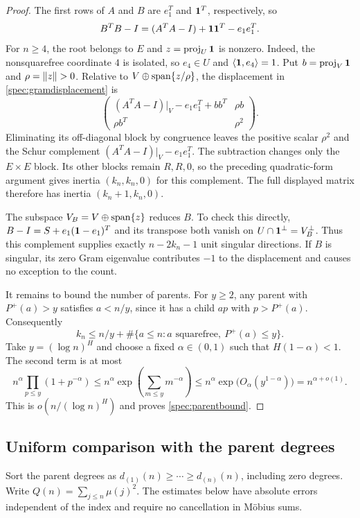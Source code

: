 \begin{proof}
The first rows of $A$ and $B$ are $e_1^T$ and $\mathbf{1}^T$, respectively, so
\begin{equation}\label{spec:gramdisplacement}
 B^TB-I=(A^TA-I)+\mathbf{1}\mathbf{1}^T-e_1e_1^T.
\end{equation}
For $n\ge4$, the root belongs to $E$ and $z=\operatorname{proj}_U\mathbf{1}$ is nonzero. Indeed, the nonsquarefree coordinate $4$ is isolated, so $e_4\in U$ and $\langle\mathbf{1},e_4\rangle=1$. Put $b=\operatorname{proj}_V\mathbf{1}$ and $\rho=\left\lVert z\right\rVert>0$. Relative to $V\oplus\operatorname{span}\{z/\rho\}$, the displacement in \eqref{spec:gramdisplacement} is
\[
 \begin{pmatrix}
 (A^TA-I)|_V-e_1e_1^T+bb^T&\rho b\\
 \rho b^T&\rho^2
 \end{pmatrix}.
\]
Eliminating its off-diagonal block by congruence leaves the positive scalar $\rho^2$ and the Schur complement $(A^TA-I)|_V-e_1e_1^T$. The subtraction changes only the $E\times E$ block. Its other blocks remain $R,R,0$, so the preceding quadratic-form argument gives inertia $(k_n,k_n,0)$ for this complement. The full displayed matrix therefore has inertia $(k_n+1,k_n,0)$.

The subspace $V_B=V\oplus\operatorname{span}\{z\}$ reduces $B$. To check this directly, $B-I=S+e_1(\mathbf{1}-e_1)^T$ and its transpose both vanish on $U\cap\mathbf{1}^\perp=V_B^\perp$. Thus this complement supplies exactly $n-2k_n-1$ unit singular directions. If $B$ is singular, its zero Gram eigenvalue contributes $-1$ to the displacement and causes no exception to the count.

It remains to bound the number of parents. For $y\ge2$, any parent with $P^+(a)>y$ satisfies $a<n/y$, since it has a child $ap$ with $p>P^+(a)$. Consequently
\[
 k_n\le n/y+\#\{a\le n:a\text{ squarefree},\ P^+(a)\le y\}.
\]
Take $y=(\log n)^H$ and choose a fixed $\alpha\in(0,1)$ such that $H(1-\alpha)<1$. The second term is at most
\[
 n^\alpha\prod_{p\le y}(1+p^{-\alpha})
 \le n^\alpha\exp\!\left(\sum_{m\le y}m^{-\alpha}\right)
 \le n^\alpha\exp\bigl(O_\alpha(y^{1-\alpha})\bigr)
 =n^{\alpha+o(1)}.
\]
This is $o(n/(\log n)^H)$ and proves \eqref{spec:parentbound}.
\end{proof}

\subsection{Uniform comparison with the parent degrees}

Sort the parent degrees as $d_{(1)}(n)\ge\cdots\ge d_{(n)}(n)$, including zero degrees. Write $Q(n)=\sum_{j\le n}\mu(j)^2$. The estimates below have absolute errors independent of the index and require no cancellation in M\"obius sums.

